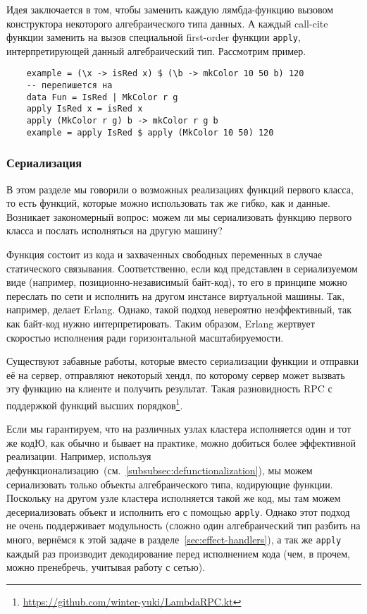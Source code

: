 Идея заключается в том, чтобы заменить каждую лямбда-функцию вызовом конструктора некоторого алгебраического типа данных.
А каждый call-cite функции заменить на вызов специальной first-order функции \texttt{apply}, интерпретирующей данный алгебраический тип.
Рассмотрим пример.

\begin{verbatim}
    example = (\x -> isRed x) $ (\b -> mkColor 10 50 b) 120
    -- перепишется на
    data Fun = IsRed | MkColor r g
    apply IsRed x = isRed x
    apply (MkColor r g) b -> mkColor r g b
    example = apply IsRed $ apply (MkColor 10 50) 120
\end{verbatim}

\subsubsection{Сериализация}

В этом разделе мы говорили о возможных реализациях функций первого класса, то есть функций, которые можно использовать так же гибко, как и данные.
Возникает закономерный вопрос: можем ли мы сериализовать функцию первого класса и послать исполняться на другую машину?

Функция состоит из кода и захваченных свободных переменных в случае статического связывания.
Соответственно, если код представлен в сериализуемом виде (например, позиционно-независимый байт-код), то его в принципе можно переслать по сети и исполнить на другом инстансе виртуальной машины.
Так, например, делает Erlang.
Однако, такой подход невероятно неэффективный, так как байт-код нужно интерпретировать.
Таким образом, Erlang жертвует скоростью исполнения ради горизонтальной масштабируемости.

Существуют забавные работы, которые вместо сериализации функции и отправки её на сервер, отправляют некоторый хендл, по которому сервер может вызвать эту функцию на клиенте и получить результат.
Такая разновидность RPC с поддержкой функций высших порядков\footnote{\url{https://github.com/winter-yuki/LambdaRPC.kt}}.

Если мы гарантируем, что на различных узлах кластера исполняется один и тот же кодЮ, как обычно и бывает на практике, можно добиться более эффективной реализации.
Например, используя дефункционализацию~(см.~\ref{subsubsec:defunctionalization}), мы можем сериализовать только объекты алгебраического типа, кодирующие функции.
Поскольку на другом узле кластера исполняется такой же код, мы там можем десериализовать объект и исполнить его с помощью \texttt{apply}.
Однако этот подход не очень поддерживает модульность (сложно один алгебраический тип разбить на много, вернёмся к этой задаче в разделе~\ref{sec:effect-handlers}), а так же \texttt{apply} каждый раз производит декодирование перед исполнением кода (чем, в прочем, можно пренебречь, учитывая работу с сетью).

